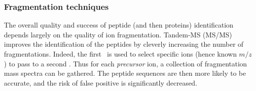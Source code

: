 \begin{comment}
Compared with other traps, linear ion traps provide an enhanced dynamic range
with a reduced low mass cut-off as the ion cloud is
spatially distributed on a linear axis and not a 3D centre which improves the
sensitivity. And then, for example, the ions may then be accumulated before
being released into another mass analyser~\mycite{Madalinski2008}.\mybr\

\minisec{\orbi}
It is a very recent analyser and it relies on \gls{FT}. Recently,
there is increasing use of \glspl{FTMS} for proteomic studies. Indeed, these
\glspl{FTMS} are more precise than previous analysers and allow the detection of
a greater range of ions in very short lapses of time~\mycite{Scigelova2011}.
In this kind of analyser, ions are trapped and both orbit around and oscillate
in an electrostatic field between an inner and outer part of a central electrode
shaped as a spindle.
The ions can only move following the spindle long axis~\mycite{Makarov2000}.
While moving around the spindle the ions create a current.
The outer part of the spindle records images of this current.
Fourier transformation of these images allows obtaining very highly accurate
and sensitive mass spectra for a greater dynamic range than most of the
other analysers.~\mycite{Hu2005}\mybr\

\minisec{\gls{LTQ}-\orbi}
It is a hybrid (tandem) mass spectrometer that uses \gls{ESI} for the ionisation
step and has an \gls{LTQ} as a first analyser (MS$^1$)
and an \orbi\ as a second one (MS$^2$).
This \gls{MS/MS} enables multiple levels of
fragmentation for the elucidation of a wide range of peptides and can be coupled
with an \gls{ESI} which is a continuous source of ionisation. This instrument
allows analysing proteomic samples optimally both in terms of starting material,
time~\mycite{Scigelova2011} and provides \enquote{ultrahigh} mass resolution,
high mass accuracy
and enhanced dynamic range with respect to mass accuracy~\mycite{Madalinski2008}.\mybr\
\end{comment}

\subsubsection{Fragmentation techniques~}

The overall quality and success of peptide (and then proteins)
identification depends largely on the quality of ion fragmentation.
Tandem-\gls{MS} (\gls{MS/MS}) improves the identification of the peptides
by cleverly increasing the number of fragmentations.
Indeed, the first \ms\ is
used to select specific ions (hence known $m/z$) to pass to a second \ms.
Thus for each \emph{precursor} ion, a collection of fragmentation mass spectra
can be gathered. The peptide sequences are then more likely to be accurate, and
the risk of false positive is significantly decreased.\mybr\

